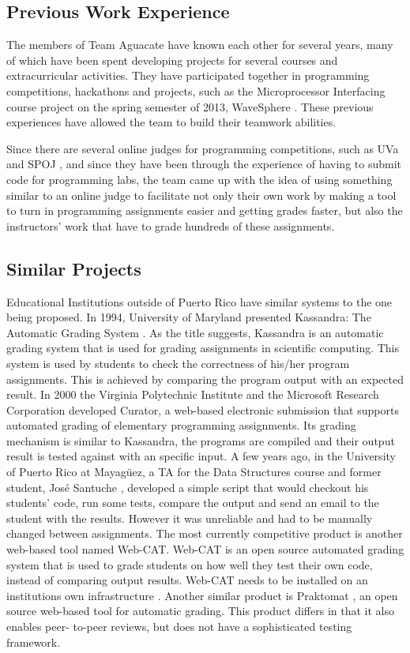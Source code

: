 
\subsection{Previous Work Experience}

The members of Team Aguacate have known each other for several years, many of
which have been spent developing projects for several courses and
extracurricular activities. They have participated together in programming
competitions, hackathons and projects, such as the Microprocessor Interfacing
course project on the spring semester of 2013, WaveSphere \cite{Micro2}. These
previous experiences have allowed the team to build their teamwork abilities.

Since there are several online judges for programming competitions, such as UVa
\cite{UVA} and SPOJ \cite{SPOJ}, and since they have been through the experience
of having to submit code for programming labs, the team came up with the idea of
using something similar to an online judge to facilitate not only their own work
by making a tool to turn in programming assignments easier and getting grades
faster, but also the instructors' work that have to grade hundreds of these
assignments.

\subsection{Similar Projects}

Educational Institutions outside of Puerto Rico have similar systems to the one
being proposed. In 1994, University of Maryland presented Kassandra: The
Automatic Grading System \cite{Matt1994}. As the title suggests, Kassandra is an
automatic grading system that is used for grading assignments in scientific
computing. This system is used by students to check the correctness of his/her
program assignments. This is achieved by comparing the program output with an
expected result. In 2000 the Virginia Polytechnic Institute and the Microsoft
Research Corporation developed Curator, a web-based electronic submission that
supports automated grading of elementary programming assignments. \cite{Curator}
Its grading mechanism is similar to Kassandra, the programs are compiled and
their output result is tested against with an specific input. A few years ago,
in the University of Puerto Rico at Mayagüez, a TA for the Data Structures
course and former student, José Santuche \cite{Santuche}, developed a simple
script that would checkout his students' code, run some tests, compare the
output and send an email to the student with the results. However it was
unreliable and had to be manually changed between assignments. The most
currently competitive product is another web-based tool named Web-CAT. Web-CAT
is an open source automated grading system that is used to grade students on how
well they test their own code, instead of comparing output results. Web-CAT
needs to be installed on an institutions own infrastructure \cite{WebCat}.
Another similar product is Praktomat \cite{Praktomat}, an open source web-based
tool for automatic grading. This product differs in that it also enables peer-
to-peer reviews, but does not have a sophisticated testing framework.

